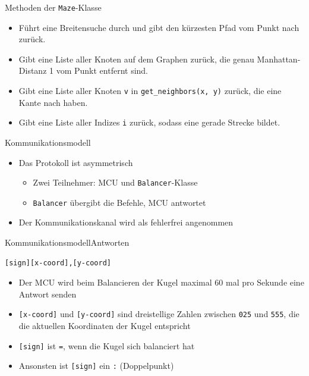 \documentclass{beamer}
\begin{document}
\begin{frame}[fragile,t]{Methoden der \verb~Maze~-Klasse}
\begin{itemize}[<+->]
\item {}

\smallskip
Führt eine Breitensuche durch und gibt den kürzesten Pfad vom Punkt  nach  zurück.
\item {}

\smallskip
Gibt eine Liste aller Knoten auf dem Graphen zurück, die genau Manhattan-Distanz 1 vom Punkt  entfernt sind.
\item {}

\smallskip
Gibt eine Liste aller Knoten \verb~v~ in \verb~get_neighbors(x, y)~ zurück, die eine Kante nach  haben.
\item {}

\smallskip
Gibt eine Liste aller Indizes \verb~i~ zurück, sodass  eine gerade Strecke bildet.
\end{itemize}
\end{frame}

\begin{frame}[fragile,t]{Kommunikationsmodell}
\begin{itemize}[<+->]
\item Das Protokoll ist asymmetrisch
\begin{itemize}
\item Zwei Teilnehmer: MCU und \verb~Balancer~-Klasse
\item \verb~Balancer~ übergibt die Befehle, MCU antwortet
\end{itemize}
\item Der Kommunikationskanal wird als fehlerfrei angenommen
\end{itemize}
\end{frame}

\begin{frame}[fragile,t]{Kommunikationsmodell}{Antworten}
\begin{verbatim}
[sign][x-coord],[y-coord]
\end{verbatim}

\pause \begin{itemize}[<+->]
\item Der MCU wird beim Balancieren der Kugel maximal 60 mal pro Sekunde eine Antwort senden
\item \texttt{[x-coord]} und \texttt{[y-coord]} sind dreistellige Zahlen zwischen \texttt{025} und \texttt{555}, die die aktuellen Koordinaten der Kugel entspricht
\item \texttt{[sign]} ist \texttt{=}, wenn die Kugel sich balanciert hat
\item Ansonsten ist \texttt{[sign]} ein \texttt{:} (Doppelpunkt)
\end{itemize}
\end{frame}
\end{document}
